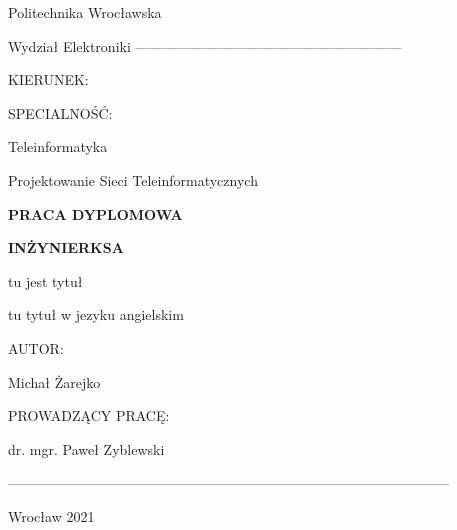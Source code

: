 \documentclass[12pt,oneside,a4paper]{report}
\begin{document}
\begin{titlepage}
   \begin{center}
        \vspace*{2cm}

        \Huge Politechnika Wrocławska

        \Huge Wydział Elektroniki
        ---------------------------------------------------------

   \end{center}
        \setlength{\columnsep}{-200pt}
        \begin{multicols}{2}
            \large KIERUNEK:


            \large SPECIALNOŚĆ: 


        \columnbreak
           Teleinformatyka

            Projektowanie Sieci Teleinformatycznych
        \end{multicols}

        \vspace{1cm}
   \begin{center}

      \huge \textbf{PRACA DYPLOMOWA}

   \huge \textbf{INŻYNIERKSA}


   \vspace{1.5cm}
   
         


            \large tu jest tytuł

            \vspace{0.5cm}

            \large tu tytuł w jezyku angielskim

            \vspace{2cm}
            \setlength{\columnsep}{-200pt}
            \begin{multicols}{2}

               \text{}

            \columnbreak
            \large AUTOR:


            Michał Żarejko


            \vspace{1cm}
            PROWADZĄCY PRACĘ:


            dr. mgr. Paweł Zyblewski

        \end{multicols}
   \vspace{3cm}

-----------------------------------------------------------------------------------------------


   Wrocław  2021

   \end{center}

\end{titlepage}
\end{document}
